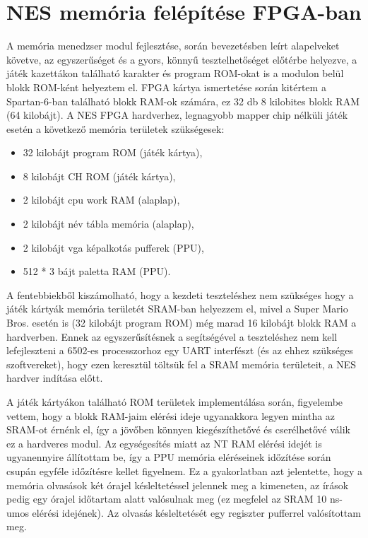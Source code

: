 \section{NES memória felépítése FPGA-ban}

A memória menedzser modul fejlesztése, során  bevezetésben leírt alapelveket követve, az egyszerűséget és a gyors, könnyű tesztelhetőséget előtérbe helyezve, a játék kazettákon található karakter és program ROM-okat is a modulon belül blokk ROM-ként helyeztem el.  FPGA kártya ismertetése során kitértem a Spartan-6-ban található blokk RAM-ok számára, ez 32 db 8 kilobites blokk RAM (64 kilobájt). A NES FPGA hardverhez, legnagyobb mapper chip nélküli játék esetén a következő memória területek szükségesek:

\begin{itemize}
	\item 32 kilobájt program ROM (játék kártya), 
	\item 8 kilobájt CH ROM (játék kártya),
	\item 2 kilobájt cpu work RAM (alaplap),
	\item 2 kilobájt név tábla memória (alaplap),
	\item 2 kilobájt vga képalkotás pufferek (PPU),
	\item 512 * 3 bájt paletta RAM (PPU).
\end{itemize}

A fentebbiekből kiszámolható, hogy a kezdeti teszteléshez nem szükséges hogy a játék kártyák memória területét SRAM-ban helyezzem el, mivel a Super Mario Bros. esetén is (32 kilobájt program ROM) még marad 16 kilobájt blokk RAM a hardverben. Ennek az egyszerűsítésnek a segítségével a teszteléshez nem kell lefejleszteni a 6502-es processzorhoz egy UART interfészt (és az ehhez szükséges szoftvereket), hogy ezen keresztül töltsük fel a SRAM memória területeit, a NES hardver indítása előtt. 

A játék kártyákon található ROM területek implementálása során, figyelembe vettem, hogy a blokk RAM-jaim elérési ideje ugyanakkora legyen mintha az SRAM-ot érnénk el, így a jövőben könnyen kiegészíthetővé és cserélhetővé válik ez a hardveres modul. Az egységesítés miatt az NT RAM elérési idejét is ugyanennyire állítottam be, így a PPU memória eléréseinek időzítése során csupán egyféle időzítésre kellet figyelnem. Ez a gyakorlatban azt jelentette, hogy a memória olvasások két órajel késleltetéssel jelennek meg a kimeneten, az írások pedig egy órajel időtartam alatt valósulnak meg (ez megfelel az SRAM 10 ns-umos elérési idejének). Az olvasás késleltetését egy regiszter pufferrel valósítottam meg.

